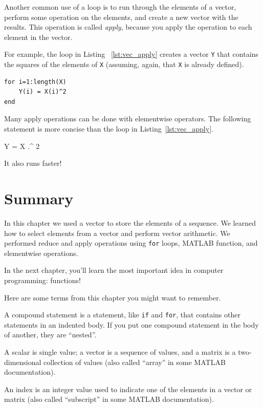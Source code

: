 Another common use of a loop is to run through the elements of
a vector, perform some operation on the elements, and create
a new vector with the results.  This operation is called
\emph{apply}, because you apply the operation to each element in
the vector.


For example, the loop in Listing ~\ref{lst:vec_apply} creates a vector {\tt Y} that
contains the squares of the elements of {\tt X} (assuming, again, that {\tt X} is already defined).

\begin{lstlisting}[caption={Making a new vector Y by squaring the elements in X }, label={lst:vec_apply}]
for i=1:length(X)
    Y(i) = X(i)^2
end
\end{lstlisting}

Many apply operations can be done with elementwise operators.
The following statement is more concise than the loop in
Listing~\ref{lst:vec_apply}.

\begin{code}
Y = X .^ 2
\end{code}

It also runs faster!


\section{Summary}

In this chapter we used a vector to store the elements of a sequence.  We learned how to select elements from a vector and perform vector arithmetic.  We performed reduce and apply operations using {\tt for} loops, MATLAB function, and elementwise operations.

In the next chapter, you'll learn the most important idea in computer programming: functions!

Here are some terms from this chapter you might want to remember.

A compound statement is a statement, like {\tt if} and {\tt for}, that
contains other statements in an indented body.
If you put one compound statement in the body of another, they are ``nested''.

A scalar is single value; a vector is a sequence of values, and a matrix is a two-dimensional collection of values (also called ``array'' in some MATLAB documentation).

An index is an integer value used to indicate one of the elements
in a vector or matrix (also called ``subscript'' in some MATLAB documentation).

